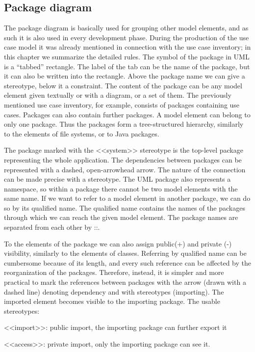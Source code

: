 \documentclass[margin=0px]{article}
\begin{document}
\subsection{Package diagram}
The package diagram is basically used for grouping other model elements, and as such it is also used in every development phase. During the production of the use case model it was already mentioned in connection with the use case inventory; in this chapter we summarize the detailed rules. The symbol of the package in UML is a ``tabbed'' rectangle. The label of the tab can be the name of the package, but it can also be written into the rectangle. Above the package name we can give a stereotype, below it a constraint. The content of the package can be any model element given textually or with a diagram, or a set of them. The previously mentioned use case inventory, for example, consists of packages containing use cases. Packages can also contain further packages. A model element can belong to only one package. Thus the packages form a tree-structured hierarchy, similarly to the elements of file systems, or to Java packages.

The package marked with the <<system>> stereotype is the top-level package representing the whole application. The dependencies between packages can be represented with a dashed, open-arrowhead arrow. The nature of the connection can be made precise with a stereotype. The UML package also represents a namespace, so within a package there cannot be two model elements with the same name. If we want to refer to a model element in another package, we can do so by its qualified name. The qualified name contains the names of the packages through which we can reach the given model element. The package names are separated from each other by ::.

To the elements of the package we can also assign public(+) and private (-) visibility, similarly to the elements of classes.
Referring by qualified name can be cumbersome because of its length, and every such reference can be affected by the reorganization of the packages. Therefore, instead, it is simpler and more practical to mark the references between packages with the arrow (drawn with a dashed line) denoting dependency and with stereotypes (importing). The imported element becomes visible to the importing package. The usable stereotypes:

<<import>>: public import, the importing package can further export it

<<access>>: private import, only the importing package can see it.
\end{document}
